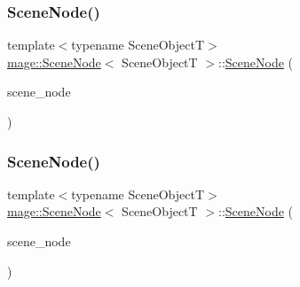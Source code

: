 \hypertarget{classmage_1_1_scene_node_a5693f183f91055371196d07cbf077322}{}\label{classmage_1_1_scene_node_a5693f183f91055371196d07cbf077322} 
\subsubsection{\texorpdfstring{Scene\+Node()}{SceneNode()}\hspace{0.1cm}{\footnotesize\ttfamily [2/3]}}
{\footnotesize\ttfamily template$<$typename Scene\+ObjectT$>$ \\
\hyperlink{classmage_1_1_scene_node}{mage\+::\+Scene\+Node}$<$ Scene\+ObjectT $>$\+::\hyperlink{classmage_1_1_scene_node}{Scene\+Node} (\begin{DoxyParamCaption}\item[{const \hyperlink{classmage_1_1_scene_node}{Scene\+Node}$<$ Scene\+ObjectT $>$ \&}]{scene\+\_\+node }\end{DoxyParamCaption})}

\hypertarget{classmage_1_1_scene_node_a514dd7c8f0f80d8be133ede010833c6d}{}\label{classmage_1_1_scene_node_a514dd7c8f0f80d8be133ede010833c6d} 
\subsubsection{\texorpdfstring{Scene\+Node()}{SceneNode()}\hspace{0.1cm}{\footnotesize\ttfamily [3/3]}}
{\footnotesize\ttfamily template$<$typename Scene\+ObjectT$>$ \\
\hyperlink{classmage_1_1_scene_node}{mage\+::\+Scene\+Node}$<$ Scene\+ObjectT $>$\+::\hyperlink{classmage_1_1_scene_node}{Scene\+Node} (\begin{DoxyParamCaption}\item[{\hyperlink{classmage_1_1_scene_node}{Scene\+Node}$<$ Scene\+ObjectT $>$ \&\&}]{scene\+\_\+node }\end{DoxyParamCaption})\hspace{0.3cm}{\ttfamily [default]}}

\hypertarget{classmage_1_1_scene_node_a2a55b3b31cc8c9ba933d1e2559e4dbc7}{}\label{classmage_1_1_scene_node_a2a55b3b31cc8c9ba933d1e2559e4dbc7} 
